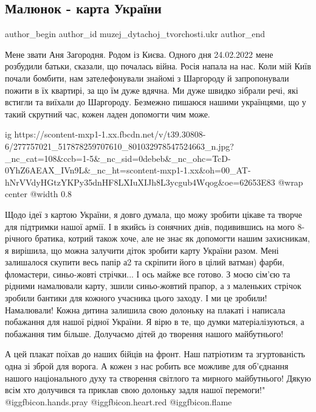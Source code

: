  
 
 
 
 
 
\subsection{Малюнок - карта України}
\label{sec:05_04_2022.fb.muzej_dytachoj_tvorchosti.ukr.1.risunok_karta_ukrainy}
 
\ifcmt
 author_begin
   author_id muzej_dytachoj_tvorchosti.ukr
 author_end
\fi

Мене звати Аня Загородня. Родом із Києва. Одного дня 24.02.2022 мене розбудили
батьки, сказали, що почалась війна. Росія напала на нас. Коли  мій Київ почали
бомбити, нам зателефонували знайомі з Шаргороду й запропонували пожити в їх
квартирі, за що їм дуже вдячна. Ми дуже швидко зібрали речі, які встигли та
виїхали до Шаргороду. Безмежно пишаюся нашими українцями, що у такий скрутний
час, кожен ладен допомогти чим може.

\ifcmt
  ig https://scontent-mxp1-1.xx.fbcdn.net/v/t39.30808-6/277757021_517878259707610_801032978547524663_n.jpg?_nc_cat=108&ccb=1-5&_nc_sid=0debeb&_nc_ohc=TcD-0YhZ6AEAX_IVn9L&_nc_ht=scontent-mxp1-1.xx&oh=00_AT-hNrVVdyHGtzYKPy35dnHF8LXIuXIJh8L3ycgub4Wqog&oe=62653E83
  @wrap center
  @width 0.8
\fi

Щодо ідеї з картою України, я довго думала, що можу зробити цікаве та творче
для підтримки нашої армії. І в якийсь із сонячних днів, подивившись на мого
8-річного братика, котрий також хоче, але не знає як допомогти нашим
захисникам, я вирішила, що можна залучити діток зробити карту України разом.
Мені залишалося скупити весь папір а2 та скріпити його в цілий ватман) фарби,
фломастери, синьо-жовті стрічки... І ось майже все готово. З моєю сім’єю та
рідними намалювали карту, зшили синьо-жовтий прапор, а з маленьких стрічок
зробили бантики для кожного учасника цього заходу. І ми це зробили! Намалювали!
Кожна дитина залишила свою долоньку на плакаті і написала побажання для нашої
рідної України. Я вірю в те, що думки  матеріалізуються, а побажання тим
більше. Долучаємо дітей до творення нашого майбутнього!

А цей  плакат поїхав  до наших бійців на фронт. Наш патріотизм та згуртованість
одна зі зброй для ворога. А кожен з нас робить все можливе для об'єднання
нашого національного  духу та створення світлого та мирного майбутнього! Дякую
всім хто долучився та приклав свою долоньку задля нашої перемоги!"
@igg{fbicon.hands.pray} @igg{fbicon.heart.red} @igg{fbicon.flame}

